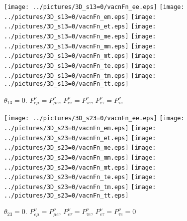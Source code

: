\begin{figure}[!ht]
\vspace*{-0.75cm}
\texttt{[image: ../pictures/3D\_s13=0/vacnFn\_ee.eps]}\hspace*{-2mm}
\texttt{[image: ../pictures/3D\_s13=0/vacnFn\_em.eps]}\hspace*{-2mm}
\texttt{[image: ../pictures/3D\_s13=0/vacnFn\_et.eps]}\hspace*{-2mm}
\texttt{[image: ../pictures/3D\_s13=0/vacnFn\_me.eps]}\hspace*{-2mm}
\texttt{[image: ../pictures/3D\_s13=0/vacnFn\_mm.eps]}\hspace*{-2mm}
\texttt{[image: ../pictures/3D\_s13=0/vacnFn\_mt.eps]}\hspace*{-2mm}
\texttt{[image: ../pictures/3D\_s13=0/vacnFn\_te.eps]}\hspace*{-2mm}
\texttt{[image: ../pictures/3D\_s13=0/vacnFn\_tm.eps]}\hspace*{-2mm}
\texttt{[image: ../pictures/3D\_s13=0/vacnFn\_tt.eps]}
\caption{$\theta_{13}=0$. $P^{\nu}_{e\mu}=P^{\nu}_{\mu{}e}$, $P^{\nu}_{e\tau}=P^{\nu}_{\tau{}e}$, $P^{\nu}_{e\tau}=P^{\nu}_{\tau{}e}$}
\label{vacn3DFn_s13=0}
\end{figure}
\begin{figure}[!ht]
\vspace*{-0.75cm}
\texttt{[image: ../pictures/3D\_s23=0/vacnFn\_ee.eps]}\hspace*{-2mm}
\texttt{[image: ../pictures/3D\_s23=0/vacnFn\_em.eps]}\hspace*{-2mm}
\texttt{[image: ../pictures/3D\_s23=0/vacnFn\_et.eps]}\hspace*{-2mm}
\texttt{[image: ../pictures/3D\_s23=0/vacnFn\_me.eps]}\hspace*{-2mm}
\texttt{[image: ../pictures/3D\_s23=0/vacnFn\_mm.eps]}\hspace*{-2mm}
\texttt{[image: ../pictures/3D\_s23=0/vacnFn\_mt.eps]}\hspace*{-2mm}
\texttt{[image: ../pictures/3D\_s23=0/vacnFn\_te.eps]}\hspace*{-2mm}
\texttt{[image: ../pictures/3D\_s23=0/vacnFn\_tm.eps]}\hspace*{-2mm}
\texttt{[image: ../pictures/3D\_s23=0/vacnFn\_tt.eps]}
\caption{$\theta_{23}=0$. $P^{\nu}_{e\mu}=P^{\nu}_{\mu{}e}$, $P^{\nu}_{e\tau}=P^{\nu}_{\tau{}e}$, $P^{\nu}_{e\tau}=P^{\nu}_{\tau{}e}=0$}
\label{vacn3DFn_s23=0}
\end{figure}

\begin{comment}
\begin{figure}[!ht]
\texttt{[image: ../pictures/vac3an\_aa.eps]}
\texttt{[image: ../pictures/vac3an\_ab.eps]}
\texttt{[image: ../pictures/vac3an\_ba.eps]}
\caption{vac3an}
\label{vac3an}
\end{figure}
\end{comment}
